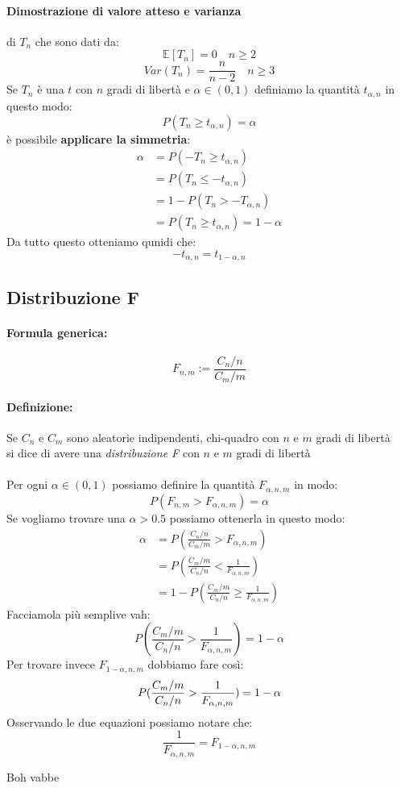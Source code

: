 \documentclass[]{article}
\newcommand{\ev}{\mathbb{E}[X]}
\renewcommand{\ev}[1]{\mathbb{E}[#1]}
\newcommand{\formula}{\paragraph{Formula generica:}}
\begin{document}
    \paragraph{Dimostrazione di valore atteso e varianza} di $T_n$ che sono dati da:
    \[ \ev{T_n} = 0 \quad n \geq 2 \]
    \[ Var(T_n) = \frac{n}{n-2} \quad n \geq 3 \]
    Se $T_n$ è una $t$ con $n$ gradi di libertà e $\alpha \in(0,1)$ definiamo la quantità $t_{\alpha,n}$ in questo modo:
    \[ P(T_n \geq t_{\alpha,n}) = \alpha \]
    è possibile \textbf{applicare la simmetria}:\
    \begin{equation*}
        \begin{split}
            \alpha &= P(-T_n \geq t_{\alpha, n}) \\
            &= P(T_n \leq -t_{\alpha, n}) \\
            &= 1 - P(T_n > -T_{\alpha, n}) \\
            &= P(T_n \geq t_{\alpha, n}) = 1 - \alpha
        \end{split}
    \end{equation*}
    Da tutto questo otteniamo qunidi che:
    \[ -t_{\alpha, n} = t_{1-\alpha, n}\]

    \subsection{Distribuzione F}
    \formula 
    \[ F_{n, m} := \frac{C_n / n}{C_m / m}\]
    \paragraph{Definizione:} Se $C_n$ e $C_m$ sono aleatorie indipendenti, chi-quadro con $n$ e $m$ gradi di libertà \\
    si dice di avere una \textit{distribuzione F} con $n$ e $m$ gradi di libertà \\ \\
    Per ogni $\alpha \in (0,1)$ possiamo definire la quantità $F_{\alpha, n, m}$ in modo:
    \[ P(F_{n,m} > F_{\alpha, n, m}) = \alpha \]
    Se vogliamo trovare una $\alpha > 0.5$ possiamo ottenerla in questo modo:
    \begin{equation*}
        \begin{split}
            \alpha &= P(\frac{C_n / n}{C_m / m} > F_{\alpha, n, m}) \\
            &= P(\frac{C_m / m}{C_n / n} < \frac{1}{F_{\alpha, n ,m}}) \\
            &= 1 - P(\frac{C_m / m}{C_n / n} \geq   \frac{1}{F_{\alpha, n, m}})
        \end{split}
    \end{equation*}
    Facciamola più semplive vah:
    \[ P(\frac{C_m / m}{C_n / n} > \frac{1}{F_{\alpha, n, m}}) = 1 - \alpha \]
    Per trovare invece $F_{1-\alpha, n, m}$ dobbiamo fare così:
    \[ P(\frac{C_m / m}{C_n / n} > \frac{1}{F_{\-\alpha, n, m}}) = 1 - \alpha \]
    Osservando le due equazioni possiamo notare che:
    \[ \frac{1}{F_{\alpha,n,m}} = F_{1-\alpha,n,m} \]
    \centerline{Boh vabbe}
\end{document}
